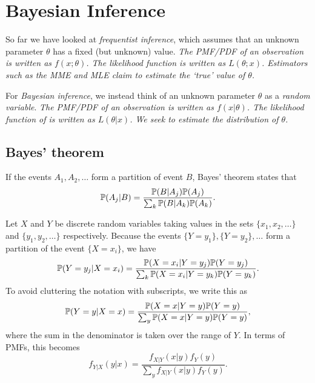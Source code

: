 \chapter{Bayesian Inference}\label{chap:randomprocesses}


So far we have looked at \emph{frequentist inference}, which assumes that an unknown parameter $\theta$ has a fixed (but unknown) value. 
\bit
\it The PMF/PDF of an observation is written as $f(x;\theta)$.
\it The likelihood function is written as $L(\theta;x)$.
\it Estimators such as the MME and MLE claim to estimate the `true' value of $\theta$.
\eit

For \emph{Bayesian inference}, we instead think of an unknown parameter $\theta$ as a \emph{random variable}.
\bit
\it The PMF/PDF of an observation is written as $f(x|\theta)$.
\it The likelihood function of is written as $L(\theta|x)$.
\it We seek to estimate the distribution of $\theta$.
\eit

\section{Bayes' theorem}

If the events $A_1,A_2,\ldots$ form a partition of event $B$, Bayes' theorem states that
\[
\mathbb{P}(A_j|B) 
	= \frac{\mathbb{P}(B|A_j)\mathbb{P}(A_j)}{\sum_k \mathbb{P}(B|A_k)\mathbb{P}(A_k)}.
\]

Let $X$ and $Y$ be discrete random variables taking values in the sets $\{x_1,x_2,\ldots\}$ and $\{y_1,y_2,\ldots\}$ respectively. Because the events $\{Y=y_1\},\{Y=y_2\},\ldots$ form a partition of the event $\{X=x_i\}$, we have %
\[
\mathbb{P}(Y=y_j|X=x_i) 
= \frac{\mathbb{P}(X=x_i|Y=y_j)\mathbb{P}(Y=y_j)}{\sum_k \mathbb{P}(X=x_i|Y=y_k)\mathbb{P}(Y=y_k)}.
\]
To avoid cluttering the notation with subscripts, we write this as
\[
\mathbb{P}(Y=y|X=x) 
= \frac{\mathbb{P}(X=x|Y=y)\mathbb{P}(Y=y)}{\sum_y \mathbb{P}(X=x|Y=y)\mathbb{P}(Y=y)},
\]
where the sum in the denominator is taken over the range of $Y$.
In terms of PMFs, this becomes
\[
f_{Y|X}(y|x) 
= \frac{f_{X|Y}(x|y)f_Y(y)}{\sum_y f_{X|Y}(x|y)f_Y(y)}.
\]

